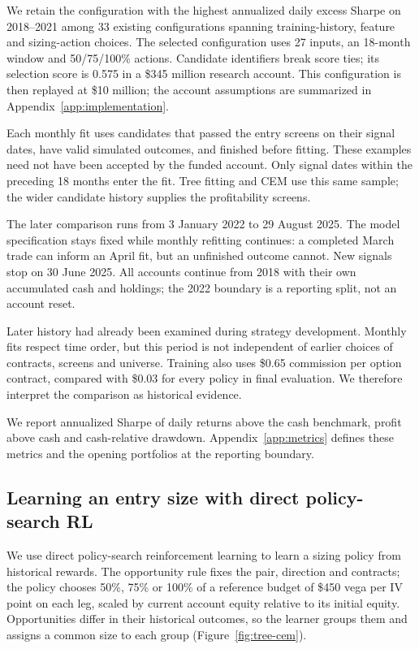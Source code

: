 \documentclass[11pt,letterpaper]{article}
\newcommand{\money}[1]{\$#1}
\begin{document}
We retain the configuration with the highest annualized daily excess Sharpe
on 2018--2021 among 33 existing configurations spanning training-history,
feature and sizing-action choices. The selected configuration uses 27 inputs,
an 18-month window and 50/75/100\% actions. Candidate identifiers break score ties; its selection score is 0.575 in a
\money{345 million} research account. This configuration is then replayed at
\money{10 million}; the account assumptions are summarized in
Appendix~\ref{app:implementation}.

Each monthly fit uses candidates that passed the entry screens on their signal
dates, have valid simulated outcomes, and finished before fitting. These
examples need not have been accepted by the funded account. Only signal dates
within the preceding 18 months enter the fit. Tree fitting and CEM use this
same sample; the wider candidate history supplies the profitability screens.

The later comparison runs from 3 January 2022 to 29 August 2025. The model
specification stays fixed while monthly refitting continues: a completed March
trade can inform an April fit, but an unfinished outcome cannot. New signals
stop on 30 June 2025. All accounts continue from 2018 with their own accumulated
cash and holdings; the 2022 boundary is a reporting split, not an account reset.

Later history had already been examined during strategy development. Monthly
fits respect time order, but this period is not independent of earlier choices
of contracts, screens and universe. Training also uses \money{0.65} commission
per option contract, compared with \money{0.03} for every policy in final
evaluation. We therefore interpret the comparison as historical evidence.

We report annualized Sharpe of daily returns above the cash benchmark, profit
above cash and cash-relative drawdown. Appendix~\ref{app:metrics} defines
these metrics and the opening portfolios at the reporting boundary.

\clearpage
\subsection{Learning an entry size with direct policy-search RL}
We use direct policy-search reinforcement learning to learn a sizing policy
from historical rewards. The opportunity rule fixes the pair, direction and
contracts; the policy chooses 50\%, 75\% or 100\% of a reference budget of \money{450} vega
per IV point on each leg, scaled by current account equity relative to its
initial equity. Opportunities differ in their historical outcomes,
so the learner groups them and assigns a common size to each group
(Figure~\ref{fig:tree-cem}).
\end{document}
